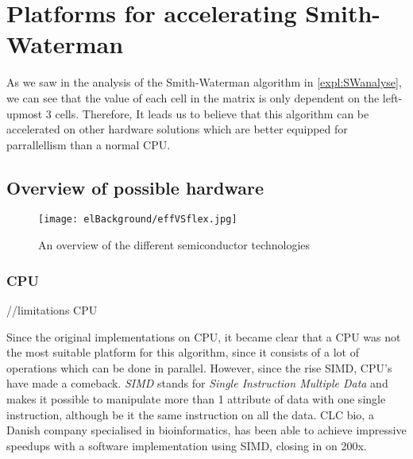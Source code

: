 
\chapter{Platforms for accelerating Smith-Waterman}
\label{ch:Platforms}

As we saw in the analysis of the Smith-Waterman algorithm in \ref{expl:SWanalyse}, we can see that the value of each cell in the matrix is only dependent on the left-upmost 3 cells. Therefore, It leads us to believe that this algorithm can be accelerated on other hardware solutions which are better equipped for parrallellism than a normal CPU.

\section{Overview of possible hardware}



\begin{figure}[H]
	\centering
	\texttt{[image: elBackground/effVSflex.jpg]}
	\caption{An overview of the different semiconductor technologies}
	\label{fig:effVSflex}
\end{figure}

\subsection{CPU}

//limitations CPU

Since the original implementations on CPU, it became clear that a CPU was not the most suitable platform for this algorithm, since it consists of a lot of operations which can be done in parallel. However, since the rise SIMD, CPU's have made a comeback. \emph{SIMD} stands for \emph{Single Instruction Multiple Data} and makes it possible to manipulate more than 1 attribute of data with one single instruction, although be it the same instruction on all the data. CLC bio, a Danish company specialised in bioinformatics, has been able to achieve impressive speedups with a software implementation using SIMD, closing in on 200x.

